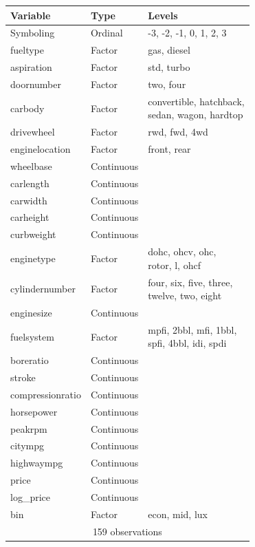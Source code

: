 \documentclass[a4paper, 10pt, titlepage]{article}
\newcommand\Bstrut{\rule[-1.2ex]{0pt}{0pt}}   %
\begin{document}
\begin{table}[!ht]
	\centering
	\begin{tabular}{|l|l|l|}
		\hline
		\textbf{Variable} & \textbf{Type} & \textbf{Levels}\\
		\hline
		Symboling & Ordinal & -3, -2, -1, 0, 1, 2, 3\\
		fueltype & Factor & gas, diesel\\
		aspiration & Factor & std, turbo\\
		doornumber & Factor & two, four\\
		carbody & Factor & \makecell[tl]{convertible, hatchback, \\sedan, wagon, hardtop\Bstrut}\\
		drivewheel & Factor & rwd, fwd, 4wd\\
		enginelocation & Factor & front, rear\\
		wheelbase & Continuous & \\
		carlength & Continuous & \\
		carwidth & Continuous & \\
		carheight & Continuous & \\
		curbweight & Continuous & \\
		enginetype & Factor & \makecell[tl]{dohc, ohcv, ohc, \\rotor, l, ohcf\Bstrut}\\
		cylindernumber & Factor & \makecell[tl]{four, six, five, three, \\twelve, two, eight\Bstrut}\\
		enginesize & Continuous & \\
		fuelsystem & Factor & \makecell[tl]{mpfi, 2bbl, mfi, 1bbl, \\spfi, 4bbl, idi, spdi\Bstrut}\\
		boreratio & Continuous & \\
		stroke & Continuous & \\
		compressionratio & Continuous & \\
		horsepower & Continuous & \\
		peakrpm & Continuous & \\
		citympg & Continuous & \\
		highwaympg & Continuous & \\
		price & Continuous & \\
		log\_price & Continuous & \\
		bin & Factor & econ, mid, lux\\
		\hline
		\multicolumn{3}{|c|}{159 observations}\\
		\hline
	\end{tabular}
	\label{table:trans data summary}
\end{table}
\end{document}
